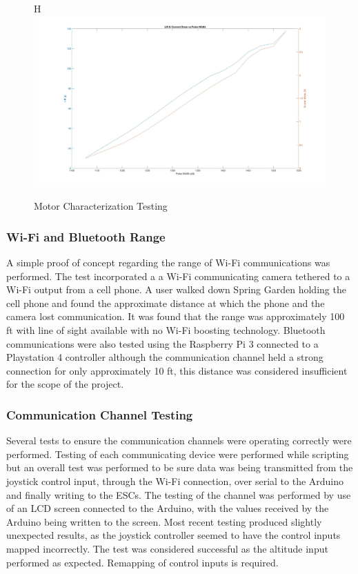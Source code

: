  \begin{figure}{H}
	\centering
	\includegraphics[width=1\textwidth]{Motor_Characterization.jpg}
	\caption{Motor Characterization Testing}
	\label{fig:Motor_Char}
\end{figure}

  \subsubsection{Wi-Fi and Bluetooth Range}
  
  A simple proof of concept regarding the range of Wi-Fi communications was performed. The test incorporated a a Wi-Fi communicating camera tethered to a Wi-Fi output from a cell phone. A user walked down Spring Garden holding the cell phone and found the approximate distance at which the phone and the camera lost communication. It was found that the range was approximately 100 ft with line of sight available with no Wi-Fi boosting technology. Bluetooth communications were also tested using the Raspberry Pi 3 connected to a Playstation 4 controller although the communication channel held a strong connection for only approximately 10 ft, this distance was considered insufficient for the scope of the project.
  
 \subsubsection{Communication Channel Testing}
 
 Several tests to ensure the communication channels were operating correctly were performed. Testing of each communicating device were performed while scripting but an overall test was performed to be sure data was being transmitted from the joystick control input, through the Wi-Fi connection, over serial to the Arduino and finally writing to the ESCs. The testing of the channel was performed by use of an LCD screen connected to the Arduino, with the values received by the Arduino being written to the screen. Most recent testing produced slightly unexpected results, as the joystick controller seemed to have the control inputs mapped incorrectly. The test was considered successful as the altitude input performed as expected. Remapping of control inputs is required. 

